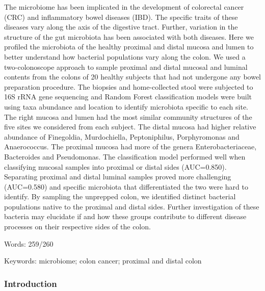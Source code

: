 \documentclass[12pt,]{article}
\begin{document}
The microbiome has been implicated in the development of colorectal
cancer (CRC) and inflammatory bowel diseases (IBD). The specific traits
of these diseases vary along the axis of the digestive tract. Further,
variation in the structure of the gut microbiota has been associated
with both diseases. Here we profiled the microbiota of the healthy
proximal and distal mucosa and lumen to better understand how bacterial
populations vary along the colon. We used a two-colonoscope approach to
sample proximal and distal mucosal and luminal contents from the colons
of 20 healthy subjects that had not undergone any bowel preparation
procedure. The biopsies and home-collected stool were subjected to 16S
rRNA gene sequencing and Random Forest classification models were built
using taxa abundance and location to identify microbiota specific to
each site. The right mucosa and lumen had the most similar community
structures of the five sites we considered from each subject. The distal
mucosa had higher relative abundance of Finegoldia, Murdochiella,
Peptoniphilus, Porphyromonas and Anaerococcus. The proximal mucosa had
more of the genera Enterobacteriaceae, Bacteroides and Pseudomonas. The
classification model performed well when classifying mucosal samples
into proximal or distal sides (AUC=0.850). Separating proximal and
distal luminal samples proved more challenging (AUC=0.580) and specific
microbiota that differentiated the two were hard to identify. By
sampling the unprepped colon, we identified distinct bacterial
populations native to the proximal and distal sides. Further
investigation of these bacteria may elucidate if and how these groups
contribute to different disease processes on their respective sides of
the colon.

Words: 259/260

Keywords: microbiome; colon cancer; proximal and distal colon

\subsubsection{Introduction}\label{introduction}
\end{document}
